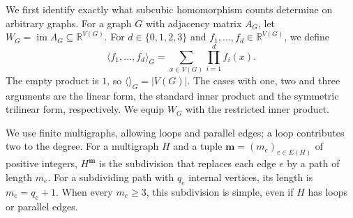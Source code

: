 \documentclass[11pt,a4paper]{article}
\theoremstyle{plain}
\theoremstyle{definition}
\DeclareMathOperator{\im}{im}
\newcommand{\R}{\mathbb{R}}
\begin{document}
We first identify exactly what subcubic homomorphism counts determine
on arbitrary graphs.
For a graph $G$ with adjacency matrix $A_G$, let
$W_G=\im A_G\subseteq\R^{V(G)}$.
For $d\in\{0,1,2,3\}$ and $f_1,\ldots,f_d\in\R^{V(G)}$, we define
\begin{equation}\label{eq:image-trilinear}
 \langle f_1,\ldots,f_d\rangle_G
 =\sum_{x\in V(G)}\prod_{i=1}^{d}f_i(x).
\end{equation}
The empty product is $1$, so $\langle\rangle_G=|V(G)|$.
The cases with one, two and three arguments are the linear form,
the standard inner product and the symmetric trilinear form, respectively.
We equip $W_G$ with the restricted inner product.

We use finite multigraphs, allowing loops and parallel edges; a loop
contributes two to the degree. For a multigraph $H$ and a tuple
$\mathbf m=(m_e)_{e\in E(H)}$ of positive integers, $H^{\mathbf m}$
is the subdivision that replaces each edge $e$ by a path of length $m_e$.
For a subdividing path with $q_e$ internal vertices, its length is $m_e=q_e+1$.
When every $m_e\geq3$, this subdivision is simple, even if $H$ has loops
or parallel edges.
\end{document}
